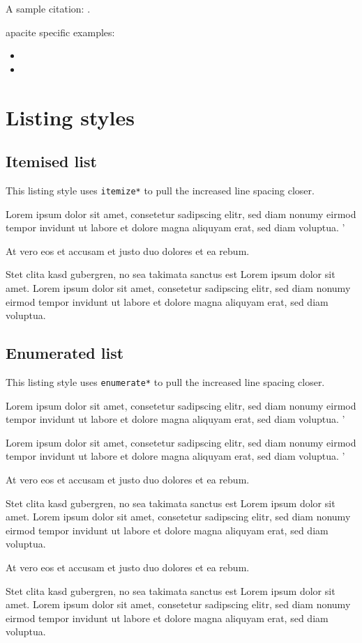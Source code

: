A sample citation: \cite{Bannon1997}.

apacite specific examples:
\begin{itemize} 
\item {}
\item {}
\end{itemize}

\newpage{}
\section{Listing styles}
\subsection{Itemised list}
This listing style uses \texttt{itemize*} to pull the increased line spacing closer.
\begin{itemize*}
\item Lorem ipsum dolor sit amet, consetetur sadipscing elitr, sed diam nonumy eirmod tempor invidunt ut labore et dolore magna aliquyam erat, sed diam voluptua. '
\item At vero eos et accusam et justo duo dolores et ea rebum. 
\item Stet clita kasd gubergren, no sea takimata sanctus est Lorem ipsum dolor sit amet. Lorem ipsum dolor sit amet, consetetur sadipscing elitr, sed diam nonumy eirmod tempor invidunt ut labore et dolore magna aliquyam erat, sed diam voluptua.
\end{itemize*}

\subsection{Enumerated list}
This listing style uses \texttt{enumerate*} to pull the increased line spacing closer.
\begin{enumerate*}
\item Lorem ipsum dolor sit amet, consetetur sadipscing elitr, sed diam nonumy eirmod tempor invidunt ut labore et dolore magna aliquyam erat, sed diam voluptua. '
	\begin{enumerate*}
	\item Lorem ipsum dolor sit amet, consetetur sadipscing elitr, sed diam nonumy eirmod tempor invidunt ut labore et dolore magna aliquyam erat, sed diam voluptua. '
	\item At vero eos et accusam et justo duo dolores et ea rebum. 
	\item Stet clita kasd gubergren, no sea takimata sanctus est Lorem ipsum dolor sit amet. Lorem ipsum dolor sit amet, consetetur sadipscing elitr, sed diam nonumy eirmod tempor invidunt ut labore et dolore magna aliquyam erat, sed diam voluptua.
	\end{enumerate*}
\item At vero eos et accusam et justo duo dolores et ea rebum. 
\item Stet clita kasd gubergren, no sea takimata sanctus est Lorem ipsum dolor sit amet. Lorem ipsum dolor sit amet, consetetur sadipscing elitr, sed diam nonumy eirmod tempor invidunt ut labore et dolore magna aliquyam erat, sed diam voluptua.
\end{enumerate*}

